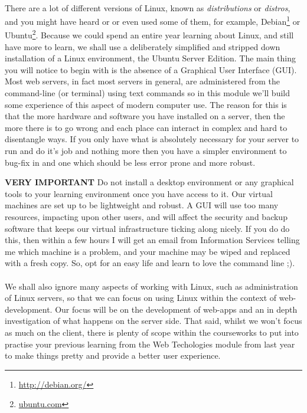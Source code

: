 \documentclass[12pt, a4paper, oneside]{book}
\begin{document}
\paragraph{} There are a lot of different versions of Linux, known as \emph{distributions} or \emph{distros}, and you might have heard or or even used some of them, for example, Debian\footnote{\url{http://debian.org/}} or Ubuntu\footnote{\url{ubuntu.com}}. Because we could spend an entire year learning about Linux, and still have more to learn, we shall use a deliberately simplified and stripped down installation of a Linux environment, the Ubuntu Server Edition. The main thing you will notice to begin with is the absence of a Graphical User Interface (GUI). Most web servers, in fact most servers in general, are administered from the command-line (or terminal) using text commands so in this module we'll build some experience of this aspect of modern computer use. The reason for this is that the more hardware and software you have installed on a server, then the more there is to go wrong and each place can interact in complex and hard to disentangle ways. If you only have what is absolutely necessary for your server to run and do it's job and nothing more then you have a simpler environment to bug-fix in and one which should be less error prone and more robust.

\begin{framed}
\textbf{VERY IMPORTANT} Do not install a desktop environment or any graphical tools to your learning environment once you have access to it. Our virtual machines are set up to be lightweight and robust. A GUI will use too many resources, impacting upon other users, and will affect the security and backup software that keeps our virtual infrastructure ticking along nicely. If you do do this, then within a few hours I will get an email from Information Services telling me which machine is a problem, and your machine may be wiped and replaced with a fresh copy. So, opt for an easy life and learn to love the command line ;).
\end{framed}

\paragraph{} We shall also ignore many aspects of working with Linux, such as administration of Linux servers, so that we can focus on using Linux within the context of web-development. Our focus will be on the development of web-apps and an in depth investigation of what happens on the server side. That said, whilst we won't focus as much on the client, there is plenty of scope within the courseworks to put into practise your previous learning from the Web Techologies module from last year to make things pretty and provide a better user experience.
\end{document}
